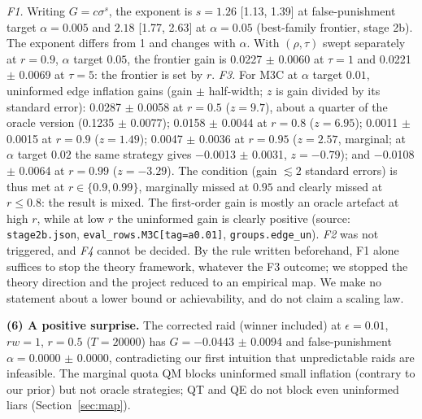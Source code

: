 \documentclass[10pt]{article}
\begin{document}
\emph{F1.} Writing $G=c\sigma^s$, the exponent is $s=1.26$ [1.13, 1.39] at false-punishment target $\alpha{=}0.005$ and $2.18$ [1.77, 2.63] at $\alpha{=}0.05$ (best-family frontier, stage 2b). The exponent differs from 1 and changes with $\alpha$. With $(\rho,\tau)$ swept separately at $r{=}0.9$, $\alpha$ target $0.05$, the frontier gain is 0.0227 $\pm$ 0.0060 at $\tau{=}1$ and 0.0221 $\pm$ 0.0069 at $\tau{=}5$: the frontier is set by $r$. \emph{F3.} For M3C at $\alpha$ target $0.01$, uninformed edge inflation gains (gain $\pm$ half-width; $z$ is gain divided by its standard error): 0.0287 $\pm$ 0.0058 at $r{=}0.5$ ($z{=}9.7$), about a quarter of the oracle version (0.1235 $\pm$ 0.0077); 0.0158 $\pm$ 0.0044 at $r{=}0.8$ ($z{=}6.95$); 0.0011 $\pm$ 0.0015 at $r{=}0.9$ ($z{=}1.49$); 0.0047 $\pm$ 0.0036 at $r{=}0.95$ ($z{=}2.57$, marginal; at $\alpha$ target $0.02$ the same strategy gives $-$0.0013 $\pm$ 0.0031, $z{=}-0.79$); and $-$0.0108 $\pm$ 0.0064 at $r{=}0.99$ ($z{=}-3.29$). The condition (gain $\lesssim2$ standard errors) is thus met at $r\in\{0.9,0.99\}$, marginally missed at $0.95$ and clearly missed at $r\le0.8$: the result is mixed. The first-order gain is mostly an oracle artefact at high $r$, while at low $r$ the uninformed gain is clearly positive (source: \texttt{stage2b.json}, \texttt{eval\_rows.M3C[tag=a0.01]}, \texttt{groups.edge\_un}). \emph{F2} was not triggered, and \emph{F4} cannot be decided. By the rule written beforehand, F1 alone suffices to stop the theory framework, whatever the F3 outcome; we stopped the theory direction and the project reduced to an empirical map. We make no statement about a lower bound or achievability, and do not claim a scaling law.

\textbf{(6) A positive surprise.} The corrected raid (winner included) at $\epsilon{=}0.01$, $rw{=}1$, $r{=}0.5$ ($T{=}20000$) has $G={}$$-$0.0443 $\pm$ 0.0094 and false-punishment $\alpha={}$0.0000 $\pm$ 0.0000, contradicting our first intuition that unpredictable raids are infeasible. The marginal quota QM blocks uninformed small inflation (contrary to our prior) but not oracle strategies; QT and QE do not block even uninformed liars (Section~\ref{sec:map}).
\end{document}
